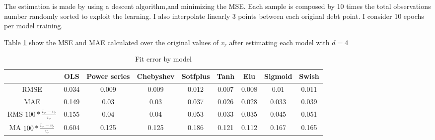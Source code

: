 \documentclass[12pt, a4paper]{article}
\begin{document}
\begin{enumerate}
	The estimation is made by using a descent algorithm,and minimizing the MSE. Each sample is composed by 10 times the total observations number randomly sorted to exploit the learning. I also interpolate linearly 3 points between each original debt point. I consider 10 epochs per model training. 
\end{enumerate}
Table \ref{tab:1} show the MSE and MAE calculated  over the original values of $v_r$ after estimating each model with $d=4$\\
\begin{table}[!hbt]
	\centering
	\caption{Fit error by model}
	\vspace{3mm}
	\begin{tabular}{|c|cccccccc|}
		\hline
		   & OLS&Power series& Chebyshev&Sotfplus&Tanh&Elu&Sigmoid&Swish\\
		\hline
		RMSE& 0.034&	0.009&	0.009&	0.012&	0.007&	0.008&	0.01&	0.011 \\
		MAE& 0.149&	0.03&	0.03&	0.037&	0.026&	0.028&	0.033&	0.039\\
		RMS $100*$ &0.155&	0.04&	0.04&	0.053&	0.033&	0.035&	0.045&	0.051	\\
		MA  $100*$ &0.604&	0.125&	0.125&	0.186&	0.121&	0.112&	0.167&	0.165\\
		\hline
	\end{tabular}
	\label{tab:1}
\end{table}
\end{document}
